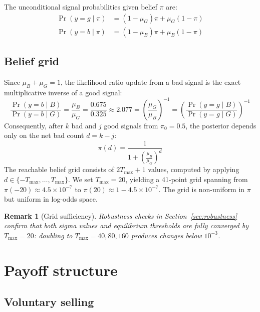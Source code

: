 \documentclass[11pt]{article}
\newtheorem{remark}{Remark}
\begin{document}
The unconditional signal probabilities given belief $\pi$ are:
\begin{align}
    \Pr(y = g \mid \pi) &= (1-\mu_G)\pi + \mu_G(1-\pi) \label{eq:prob_good} \\
    \Pr(y = b \mid \pi) &= (1-\mu_B)\pi + \mu_B(1-\pi) \label{eq:prob_bad}
\end{align}

\subsection{Belief grid}\label{sec:belief_grid}

Since $\mu_B + \mu_G = 1$, the likelihood ratio update from a bad signal is
the exact multiplicative inverse of a good signal:
\[
    \frac{\Pr(y=b \mid B)}{\Pr(y=b \mid G)} = \frac{\mu_B}{\mu_G}
    = \frac{0.675}{0.325} \approx 2.077
    = \left(\frac{\mu_G}{\mu_B}\right)^{-1}
    = \left(\frac{\Pr(y=g \mid B)}{\Pr(y=g \mid G)}\right)^{-1}
\]
Consequently, after $k$ bad and $j$ good signals from $\pi_0 = 0.5$, the
posterior depends only on the net bad count $d = k - j$:
\begin{equation}
    \pi(d) = \frac{1}{1 + \left(\frac{\mu_B}{\mu_G}\right)^d}
    \label{eq:belief_grid}
\end{equation}
The reachable belief grid consists of $2T_{\max} + 1$ values, computed by
applying $d \in \{-T_{\max}, \ldots, T_{\max}\}$. We set $T_{\max} = 20$,
yielding a 41-point grid spanning from $\pi(-20) \approx 4.5 \times 10^{-7}$
to $\pi(20) \approx 1 - 4.5 \times 10^{-7}$. The grid is non-uniform in
$\pi$ but uniform in log-odds space.

\begin{remark}[Grid sufficiency]
Robustness checks in Section~\ref{sec:robustness} confirm that both sigma
values and equilibrium thresholds are fully converged by $T_{\max} = 20$:
doubling to $T_{\max} = 40, 80, 160$ produces changes below $10^{-3}$.
\end{remark}

\section{Payoff structure}

\subsection{Voluntary selling}
\end{document}
